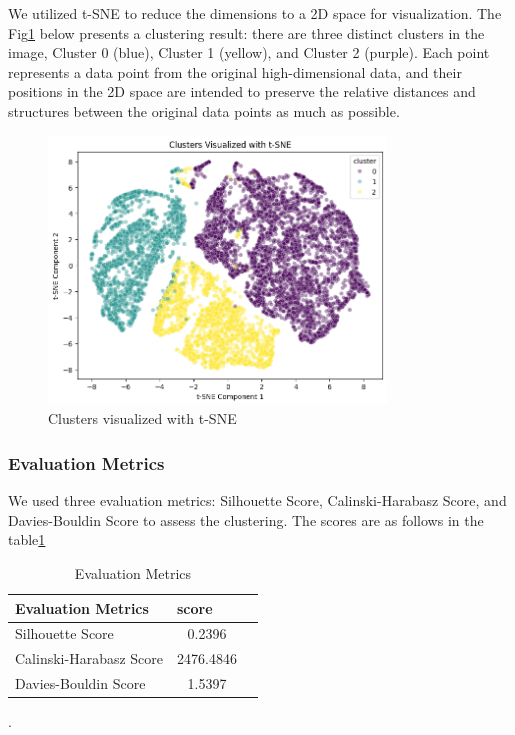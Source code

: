 \documentclass{article}
\begin{document}
We utilized t-SNE to reduce the dimensions to a 2D space for visualization. The Fig\ref{fig:Clusters visualized with t-SNE} below presents a clustering result: there are three distinct clusters in the image, Cluster 0 (blue), Cluster 1 (yellow), and Cluster 2 (purple). Each point represents a data point from the original high-dimensional data, and their positions in the 2D space are intended to preserve the relative distances and structures between the original data points as much as possible.
\begin{figure}[hbt!]
    \centering
    \includegraphics[width=0.8\textwidth]{fig/zya/t-sne-kmeans.png}
    \caption{Clusters visualized with t-SNE}
    \label{fig:Clusters visualized with t-SNE}  %
\end{figure}

\subsubsection{Evaluation Metrics}
We used three evaluation metrics: Silhouette Score, Calinski-Harabasz Score, and Davies-Bouldin Score to assess the clustering. The scores are as follows in the table\ref{table:Evaluation Metrics}
\begin{table}[hbt!]
\centering
\caption{Evaluation Metrics}
\begin{tabular}{lcc}
\hline
Evaluation Metrics & \multicolumn{1}{l}{score} \\
\hline
Silhouette Score     & 0.2396 \\
Calinski-Harabasz Score  & 2476.4846 \\
Davies-Bouldin Score          & 1.5397 \\
\hline
\end{tabular}
\label{table:Evaluation Metrics}
\end{table}
.\par
\end{document}
